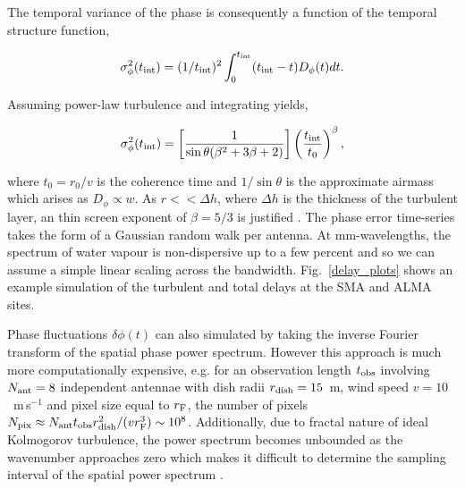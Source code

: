 The temporal variance of the phase is consequently a function of the temporal structure function, \citep*{Treuhaft_1987} 

\begin{equation}
\sigma^2_{\phi}(t_{\rm int}) = (1/t_{\rm int})^2 \int_{0}^{t_{\rm int}} (t_{\rm int}-t) D_{\phi}(t) dt.
\end{equation}

Assuming power-law turbulence and integrating yields, 

\begin{equation}
\sigma^2_\phi (t_{\rm int})=\left[\frac{1}{\sin\theta(\beta^2 +3\beta +2)}\right]\left(\frac{t_{\rm int}}{t_0}\right)^{\beta},
\end{equation}


\noindent where $t_0 = r_0/v$ is the coherence time and $1/\sin\theta$ is the approximate airmass which arises as $D_\phi \propto w$. As $r<<\Delta h$, where $\Delta h$ is the thickness of the turbulent layer, an thin screen exponent of $\beta = 5/3$ is justified \citep*{Treuhaft_1987}. The phase error time-series takes the form of a Gaussian random walk per antenna. At mm-wavelengths, the spectrum of water vapour is non-dispersive up to a few percent \cite{Curtis_2009} and so we can assume a simple linear scaling across the bandwidth. Fig.~\ref{delay_plots} shows an example simulation of the turbulent and total delays at the SMA and ALMA sites.


Phase fluctuations $\delta\phi(t)$ can also simulated by taking the inverse Fourier transform of the spatial phase power spectrum. However this approach is much more computationally expensive, e.g. for an observation length $t_{\rm obs}$ involving $N_{\rm ant}=8$ independent antennae with dish radii $r_{\rm dish}=15$~m, wind speed $v=10$~m\,s$^{-1}$ and pixel size equal to $r_{\rm F}$, the number of pixels $N_{\rm pix} \approx N_{\rm ant} t_{\rm obs} r_{\rm dish}^2/(v r_{\rm F}^3)  \sim 10^8$. Additionally, due to fractal nature of ideal Kolmogorov turbulence, the power spectrum becomes unbounded as the wavenumber approaches zero which makes it difficult to determine the sampling interval of the spatial power spectrum \cite{Lane_1992}. 



